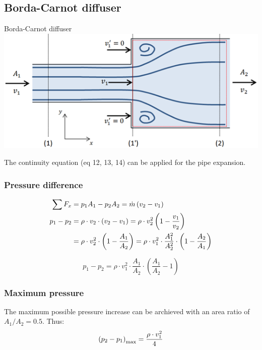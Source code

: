 \documentclass{article}
\begin{document}
\begin{multicols}{2}
\subsection{Borda-Carnot diffuser}
\begin{examplebox}{Borda-Carnot diffuser}
    \includegraphics[width=\textwidth]{media/bordaCarnot.png}

    The continuity equation (eq 12, 13, 14) can be applied for the pipe expansion.

    \subsubsection{Pressure difference}
    \vspace*{-0.3cm}
    \begin{align}
        \sum F_x &= p_1A_1 - p_2A_2 = \dot{m}\left(v_2-v_1\right) \\
        p_1 - p_2 &= \rho \cdot v_2 \cdot \left(v_2 - v_1\right) = \rho \cdot v_2^2 \left(1-\frac{v_1}{v_2}\right) \notag \\
        &= \rho \cdot v_2^2\cdot\left(1-\frac{A_1}{A_2}\right) = \rho\cdot v_1^2 \cdot \frac{A_1^2}{A_2^2}\cdot \left(1-\frac{A_2}{A_1}\right)\notag
    \end{align}

    \begin{equation}
        p_1 - p_2 = \rho \cdot v_1^2\cdot \frac{A_1}{A_2}\cdot \left(\frac{A_1}{A_2}-1\right)
    \end{equation}

    \subsubsection{Maximum pressure}
    The maximum possible pressure increase can be archieved with an
    area ratio of $A_1 / A_2 = 0.5$. Thus:
    \begin{equation} 
        \left(p_2 - p_1\right)_{\rm max} = \frac{\rho\cdot v_1^2}{4}
    \end{equation}

\end{examplebox}
\end{multicols}
\end{document}
